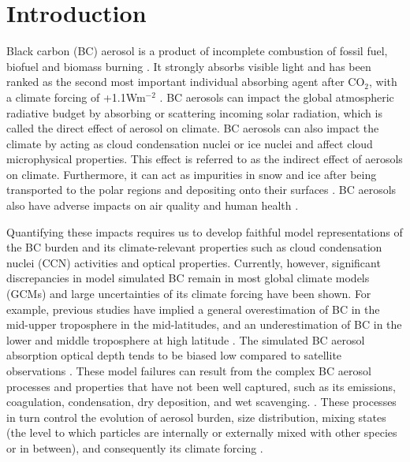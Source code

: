 \documentclass[12pt, fullpage]{uiucthesis2009}
\begin{document}
\chapter{Introduction}
	Black carbon (BC) aerosol is a product of incomplete combustion of fossil fuel, biofuel and biomass burning \citep[e.g.][]{Bond2004,forsstrom2013}. It strongly absorbs visible light and has been ranked as the second most important individual absorbing agent after CO$_{2}$, with a climate forcing of +1.1Wm$^{-2}$ \citep{Bond2013}. BC aerosols can impact the global atmospheric radiative budget by absorbing or scattering incoming solar radiation, which is called the direct effect of aerosol on climate. BC aerosols can also impact the climate by acting as cloud condensation nuclei or ice nuclei and affect cloud microphysical properties. This effect is referred to as the indirect effect of aerosols on climate. Furthermore, it can act as impurities in snow and ice after being transported to the polar regions and depositing onto their surfaces \citep[e.g.][]{zuberi2005hydrophilic,flanner2007present}. BC aerosols also have adverse impacts on air quality and human health \citep{highwood2006smoke}.
	
	Quantifying these impacts requires us to develop faithful model representations of the BC burden and its climate-relevant properties such as cloud condensation nuclei (CCN) activities and optical properties. Currently, however, significant discrepancies in model simulated BC remain in most global climate models (GCMs) and large uncertainties of its climate forcing have been shown. For example, previous studies have implied a general overestimation of BC in the mid-upper troposphere in the mid-latitudes, and an underestimation of BC in the lower and middle troposphere at high latitude \citep[e.g.][]{koch2009evaluation,schwarz2010global,fan2012easy}. The simulated BC aerosol absorption optical depth tends to be biased low compared to satellite observations \citep[e.g.][]{koch2009evaluation}. These model failures can result from the complex BC aerosol processes and properties that have not been well captured, such as its emissions, coagulation, condensation, dry deposition, and wet scavenging. \citep[][]{hakami2005adjoint,koch2009evaluation,shindell2012simultaneously}. These processes in turn control the evolution of aerosol burden, size distribution, mixing states (the level to which particles are internally or externally mixed with other species or in between), and consequently its climate forcing \citep[e.g.][]{schulz2006radiative}. 
	
\end{document}

